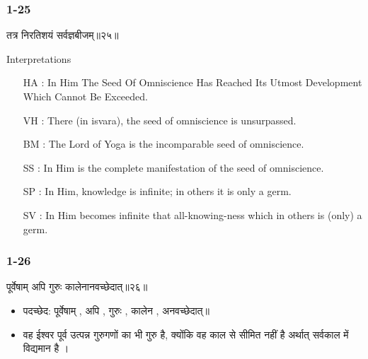 \begin{frame}[fragile]\frametitle{1-25}
\begin{sanskrit}
तत्र निरतिशयं सर्वज्ञबीजम्॥२५॥
\end{sanskrit}

Interpretations
\begin{itemize}	
\item [HA]: In Him The Seed Of Omniscience Has Reached Its Utmost Development Which Cannot Be Exceeded.
\item [VH]: There (in isvara), the seed of omniscience is unsurpassed.
\item [BM]: The Lord of Yoga is the incomparable seed of omniscience.
\item [SS]: In Him is the complete manifestation of the seed of omniscience.
\item [SP]: In Him, knowledge is infinite; in others it is only a germ.
\item [SV]: In Him becomes infinite that all-knowing-ness which in others is (only) a germ. 
\end{itemize}
	
\end{frame}

\begin{frame}[fragile]\frametitle{1-26}
\begin{sanskrit}
पूर्वेषाम् अपि गुरुः कालेनानवच्छेदात्॥२६॥
\end{sanskrit}

\begin{itemize}
\item पदच्छेद: पूर्वेषाम् , अपि , गुरुः , कालेन , अनवच्छेदात्॥
\item वह ईश्वर पूर्व उत्पन्न गुरुगणों का भी गुरु है, क्योंकि वह काल से सीमित नहीं है अर्थात् सर्वकाल में विद्यमान है ।
\end{itemize}
	
\end{frame}


